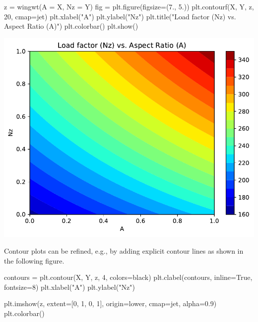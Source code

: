 \documentclass[
  letterpaper,
  DIV=11,
  numbers=noendperiod]{scrreprt}
\newenvironment{Shaded}{\begin{snugshade}}{\end{snugshade}}
\newcommand{\DecValTok}[1]{\textcolor[rgb]{0.68,0.00,0.00}{#1}}
\newcommand{\FloatTok}[1]{\textcolor[rgb]{0.68,0.00,0.00}{#1}}
\newcommand{\NormalTok}[1]{\textcolor[rgb]{0.00,0.23,0.31}{#1}}
\newcommand{\OperatorTok}[1]{\textcolor[rgb]{0.37,0.37,0.37}{#1}}
\newcommand{\StringTok}[1]{\textcolor[rgb]{0.13,0.47,0.30}{#1}}
\newcommand{\VariableTok}[1]{\textcolor[rgb]{0.07,0.07,0.07}{#1}}
\begin{document}
\begin{Shaded}
\begin{Highlighting}[]
\NormalTok{z }\OperatorTok{=}\NormalTok{ wingwt(A }\OperatorTok{=}\NormalTok{ X, Nz }\OperatorTok{=}\NormalTok{ Y)}
\NormalTok{fig }\OperatorTok{=}\NormalTok{ plt.figure(figsize}\OperatorTok{=}\NormalTok{(}\FloatTok{7.}\NormalTok{, }\FloatTok{5.}\NormalTok{))}
\NormalTok{plt.contourf(X, Y, z, }\DecValTok{20}\NormalTok{, cmap}\OperatorTok{=}\StringTok{\textquotesingle{}jet\textquotesingle{}}\NormalTok{)}
\NormalTok{plt.xlabel(}\StringTok{"A"}\NormalTok{)}
\NormalTok{plt.ylabel(}\StringTok{"Nz"}\NormalTok{)}
\NormalTok{plt.title(}\StringTok{"Load factor (Nz) vs. Aspect Ratio (A)"}\NormalTok{)}
\NormalTok{plt.colorbar()}
\NormalTok{plt.show()}
\end{Highlighting}
\end{Shaded}

\includegraphics{002_awwe_files/figure-pdf/cell-5-output-1.pdf}

Contour plots can be refined, e.g., by adding explicit contour lines as
shown in the following figure.

\begin{Shaded}
\begin{Highlighting}[]
\NormalTok{contours }\OperatorTok{=}\NormalTok{ plt.contour(X, Y, z, }\DecValTok{4}\NormalTok{, colors}\OperatorTok{=}\StringTok{\textquotesingle{}black\textquotesingle{}}\NormalTok{)}
\NormalTok{plt.clabel(contours, inline}\OperatorTok{=}\VariableTok{True}\NormalTok{, fontsize}\OperatorTok{=}\DecValTok{8}\NormalTok{)}
\NormalTok{plt.xlabel(}\StringTok{"A"}\NormalTok{)}
\NormalTok{plt.ylabel(}\StringTok{"Nz"}\NormalTok{)}

\NormalTok{plt.imshow(z, extent}\OperatorTok{=}\NormalTok{[}\DecValTok{0}\NormalTok{, }\DecValTok{1}\NormalTok{, }\DecValTok{0}\NormalTok{, }\DecValTok{1}\NormalTok{], origin}\OperatorTok{=}\StringTok{\textquotesingle{}lower\textquotesingle{}}\NormalTok{,}
\NormalTok{           cmap}\OperatorTok{=}\StringTok{\textquotesingle{}jet\textquotesingle{}}\NormalTok{, alpha}\OperatorTok{=}\FloatTok{0.9}\NormalTok{)}
\NormalTok{plt.colorbar()}
\end{Highlighting}
\end{Shaded}
\end{document}
